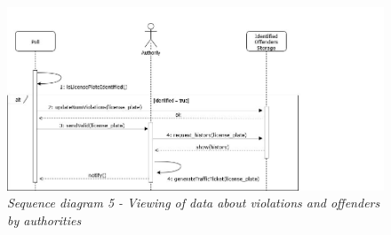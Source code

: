 \begin{figure}[H]
    \centering
    \includegraphics[width=\textwidth]{RASD_Images/SequenceDiagrams/5.jpg}
    \caption{\textit{Sequence diagram 5 - Viewing of data about violations and offenders by authorities}}
\end{figure}

